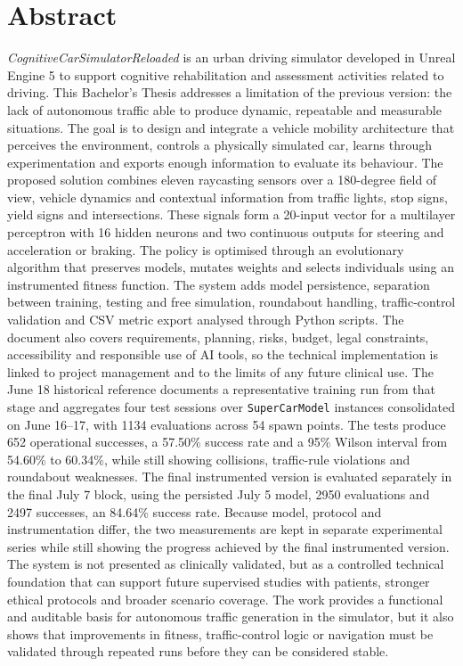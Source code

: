 \cleardoublepage%
\chapter*{Abstract}

\begingroup
{}
\noindent\textit{CognitiveCarSimulatorReloaded} is an urban driving simulator developed in Unreal Engine 5 to support cognitive rehabilitation and assessment activities related to driving. This Bachelor's Thesis addresses a limitation of the previous version: the lack of autonomous traffic able to produce dynamic, repeatable and measurable situations. The goal is to design and integrate a vehicle mobility architecture that perceives the environment, controls a physically simulated car, learns through experimentation and exports enough information to evaluate its behaviour. The proposed solution combines eleven raycasting sensors over a 180-degree field of view, vehicle dynamics and contextual information from traffic lights, stop signs, yield signs and intersections. These signals form a 20-input vector for a multilayer perceptron with 16 hidden neurons and two continuous outputs for steering and acceleration or braking. The policy is optimised through an evolutionary algorithm that preserves models, mutates weights and selects individuals using an instrumented fitness function. The system adds model persistence, separation between training, testing and free simulation, roundabout handling, traffic-control validation and CSV metric export analysed through Python scripts. The document also covers requirements, planning, risks, budget, legal constraints, accessibility and responsible use of AI tools, so the technical implementation is linked to project management and to the limits of any future clinical use. The June 18 historical reference documents a representative training run from that stage and aggregates four test sessions over \texttt{SuperCarModel} instances consolidated on June 16--17, with 1134 evaluations across 54 spawn points. The tests produce 652 operational successes, a 57.50\% success rate and a 95\% Wilson interval from 54.60\% to 60.34\%, while still showing collisions, traffic-rule violations and roundabout weaknesses. The final instrumented version is evaluated separately in the final July 7 block, using the persisted July 5 model, 2950 evaluations and 2497 successes, an 84.64\% success rate. Because model, protocol and instrumentation differ, the two measurements are kept in separate experimental series while still showing the progress achieved by the final instrumented version. The system is not presented as clinically validated, but as a controlled technical foundation that can support future supervised studies with patients, stronger ethical protocols and broader scenario coverage. The work provides a functional and auditable basis for autonomous traffic generation in the simulator, but it also shows that improvements in fitness, traffic-control logic or navigation must be validated through repeated runs before they can be considered stable.
\par\endgroup
